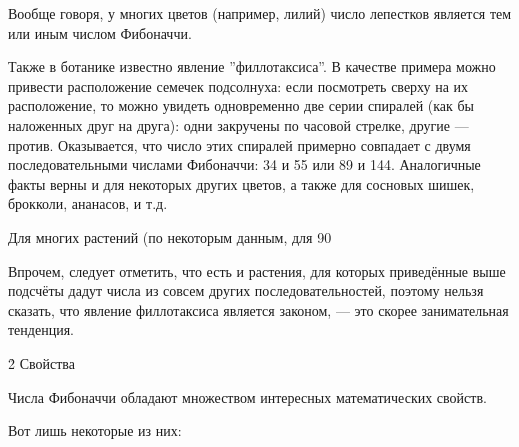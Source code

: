 Вообще говоря, у многих цветов (например, лилий) число лепестков является тем или иным числом Фибоначчи.

Также в ботанике известно явление ''филлотаксиса''. В качестве примера можно привести расположение семечек подсолнуха: если посмотреть сверху на их расположение, то можно увидеть одновременно две серии спиралей (как бы наложенных друг на друга): одни закручены по часовой стрелке, другие --- против. Оказывается, что число этих спиралей примерно совпадает с двумя последовательными числами Фибоначчи: 34 и 55 или 89 и 144. Аналогичные факты верны и для некоторых других цветов, а также для сосновых шишек, брокколи, ананасов, и т.д.

Для многих растений (по некоторым данным, для 90%

Впрочем, следует отметить, что есть и растения, для которых приведённые выше подсчёты дадут числа из совсем других последовательностей, поэтому нельзя сказать, что явление филлотаксиса является законом, --- это скорее занимательная тенденция.


\h2{ Свойства }

Числа Фибоначчи обладают множеством интересных математических свойств.

Вот лишь некоторые из них:

